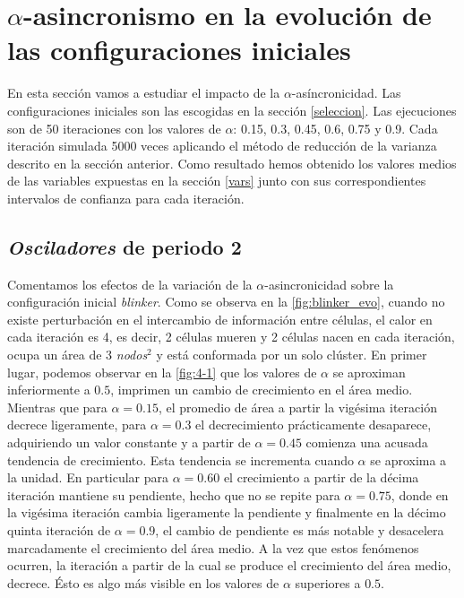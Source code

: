 \documentclass[../proyecto.tex]{memoir}
\begin{document}
\section{$\alpha$-asincronismo en la evolución de las configuraciones iniciales}

En esta sección vamos a estudiar el impacto de la $\alpha$-asíncronicidad. Las configuraciones iniciales son las escogidas en la sección \ref{seleccion}. Las ejecuciones son de 50 iteraciones con los valores de $\alpha$: 0.15, 0.3, 0.45, 0.6, 0.75 y 0.9. Cada iteración simulada 5000 veces aplicando el método de reducción de la varianza descrito en la sección anterior. Como resultado hemos obtenido los valores medios de las variables expuestas en la sección \ref{vars} junto con sus correspondientes intervalos de confianza para cada iteración.

\subsection{\textit{Osciladores} de periodo 2}

Comentamos los efectos de la variación de la $\alpha$-asincronicidad sobre la configuración inicial \textit{blinker}. Como se observa en la \autoref{fig:blinker_evo}, cuando no existe perturbación en el intercambio de información entre células, el calor en cada iteración es 4, es decir, 2 células mueren y 2 células nacen en cada iteración, ocupa un área de 3 \textit{nodos}$^2$ y está conformada por un solo clúster. En primer lugar, podemos observar en la \autoref{fig:4-1} que los valores de $\alpha$ se aproximan inferiormente a $0.5$, imprimen un cambio de crecimiento en el área medio. Mientras que para $\alpha=0.15$, el promedio de área a partir la vigésima iteración decrece ligeramente, para $\alpha=0.3$ el decrecimiento prácticamente desaparece, adquiriendo un valor constante y a partir de $\alpha=0.45$ comienza una acusada tendencia de crecimiento. Esta tendencia se incrementa cuando $\alpha$ se aproxima a la unidad. En particular para $\alpha=0.60$ el crecimiento a partir de la décima iteración mantiene su pendiente, hecho que no se repite para $\alpha=0.75$, donde en la vigésima iteración cambia ligeramente la pendiente y finalmente en la décimo quinta iteración de $\alpha=0.9$, el cambio de pendiente es más notable y desacelera marcadamente el crecimiento del área medio. A la vez que estos fenómenos ocurren, la iteración a partir de la cual se produce el crecimiento del área medio, decrece. Ésto es algo más visible en los valores de $\alpha$ superiores a $0.5$.
\end{document}

